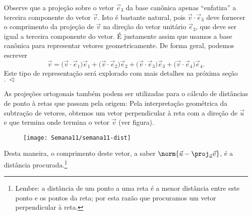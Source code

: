 \begin{ex}
\begin{equation}
	\end{equation} Observe que a projeção sobre o vetor $\vec{e}_3$ da base canônica apenas ``enfatiza'' a terceira componente do vetor $\vec{v}$. Isto é bastante natural, pois $\vec{v} \cdot \vec{e}_3$ deve fornecer o comprimento da projeção de $\vec{v}$ na direção do vetor unitário $\vec{e}_3$, que deve ser igual a terceira componente do vetor. É justamente assim que usamos a base canônica para representar vetores geometricamente. De forma geral, podemos escrever
	\begin{equation}
	\vec{v} = \big( \vec{v} \cdot \vec{e}_1 \big) \vec{e}_1 + \big( \vec{v} \cdot \vec{e}_2 \big) \vec{e}_2  + \big( \vec{v} \cdot \vec{e}_3 \big) \vec{e}_3  + \big( \vec{v} \cdot \vec{e}_4 \big) \vec{e}_4.
	\end{equation} Este tipo de representação será explorado com mais detalhes na próxima seção$. \ \lhd$
\end{ex}

As projeções ortogonais também podem ser utilizadas para o cálculo de distâncias de ponto à retas que passam pela origem: Pela interpretação geométrica da subtração de vetores, obtemos um vetor perpendicular à reta com a direção de $\vec{u}$ e que termina onde termina o vetor $\vec{v}$ (ver figura).
\begin{figure}[h!]
	\begin{center}
		\texttt{[image: Semana11/semana11-dist]}
	\end{center}
\end{figure}

\noindent Desta maneira, o comprimento deste vetor, a saber $\norm{\vec{u} - \proj_{\vec{u}} \vec{v}}$, é a distância procurada.\footnote{Lembre: a distância de um ponto a uma reta é a menor distância entre este ponto e os pontos da reta; por esta razão que procuramos um vetor perpendicular à reta.}

